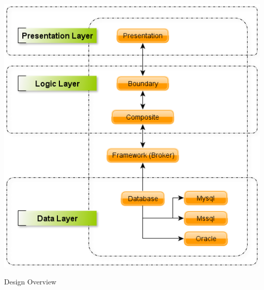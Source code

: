 		\begin{figurehere}
			\begin{center}
			\includegraphics[scale=0.6]{pages/chapter3/figures/designarch.png}
			\end{center}
			\caption{Design Overview}
			\label{fig:designoverview}
		\end{figurehere}			

